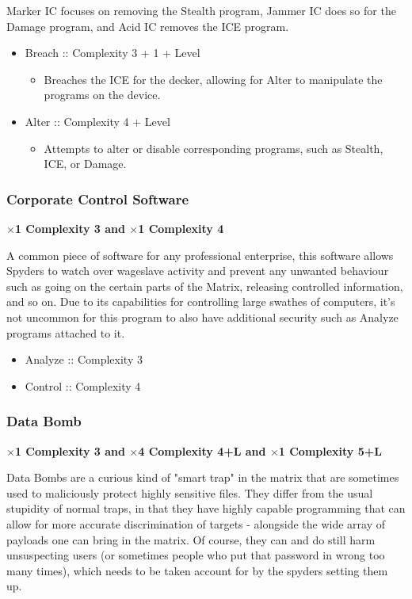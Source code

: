 \begin{multicols}{2}
	Marker IC focuses on removing the Stealth program, Jammer IC does so for the Damage program, and Acid IC removes the ICE program.
	
	\begin{itemize}
		\itemsep 0pt
		\item Breach :: Complexity 3 + 1 + Level
		\begin{itemize}
			\itemsep 0pt
			\item Breaches the ICE for the decker, allowing for Alter to manipulate the programs on the device.
		\end{itemize}
		\item Alter :: Complexity 4 + Level
		\begin{itemize}
			\itemsep 0pt
			\item Attempts to alter or disable corresponding programs, such as Stealth, ICE, or Damage.
		\end{itemize}
	\end{itemize}
	
	\subsubsection{Corporate Control Software}
	
	\textbf{$\times$1 Complexity 3 and $\times$1 Complexity 4}
	
	A common piece of software for any professional enterprise, this software allows Spyders to watch over wageslave activity and prevent any unwanted behaviour such as going on the certain parts of the Matrix, releasing controlled information, and so on. Due to its capabilities for controlling large swathes of computers, it's not uncommon for this program to also have additional security such as Analyze programs attached to it.
	
	\begin{itemize}
		\itemsep 0pt
		\item Analyze :: Complexity 3
		\item Control :: Complexity 4
	\end{itemize}
	
	\subsubsection{Data Bomb}
	
	\textbf{$\times$1 Complexity 3 and $\times$4 Complexity 4+L and $\times$1 Complexity 5+L}
	
	Data Bombs are a curious kind of "smart trap" in the matrix that are sometimes used to maliciously protect highly sensitive files. They differ from the usual stupidity of normal traps, in that they have highly capable programming that can allow for more accurate discrimination of targets - alongside the wide array of payloads one can bring in the matrix. Of course, they can and do still harm unsuspecting users (or sometimes people who put that password in wrong too many times), which needs to be taken account for by the spyders setting them up.
	

\end{multicols}
